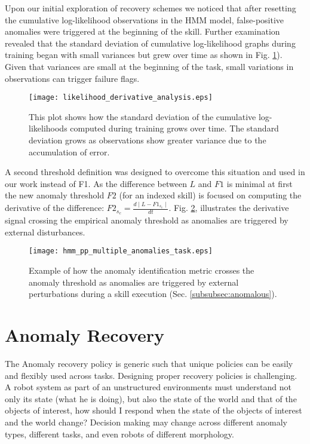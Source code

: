 \documentclass[letterpaper, 10 pt, conference]{ieeeconf}  %
\begin{document}
Upon our initial exploration of recovery schemes we noticed that after resetting the cumulative log-likelihood observations in the HMM model, false-positive anomalies were triggered at the beginning of the skill. Further examination revealed that the standard deviation of cumulative log-likelihood graphs during training began with small variances but grew over time as shown in Fig. \ref{fig:growing_std_dev_likelihood}). Given that variances are small at the beginning of the task, small variations in observations can trigger failure flags. 
\begin{figure}[b]     
	\centering		
		\texttt{[image: likelihood\_derivative\_analysis.eps]}
		\caption{This plot shows how the standard deviation of the cumulative log-likelihoods computed during training grows over time. The standard deviation grows as observations show greater variance due to the accumulation of error.}
        \label{fig:growing_std_dev_likelihood}        
\end{figure}
A second threshold definition was designed to overcome this situation and used in our work instead of F1. As the difference between $L$ and $F1$ is minimal at first the new anomaly threshold $F2$ (for an indexed skill) is focused on computing the derivative of the difference: $F2_{s_c}=\frac{d\mid L-F1_{s_c} \mid}{dt}$. Fig. \ref{fig:derivative_threshold}, illustrates the derivative signal crossing the empirical anomaly threshold as anomalies are triggered by external disturbances.
\begin{figure}     
	\centering		
		\texttt{[image: hmm\_pp\_multiple\_anomalies\_task.eps]}
		\caption{Example of how the anomaly identification metric crosses the anomaly threshold as anomalies are triggered by external perturbations during a skill execution (Sec. \ref{subsubsec:anomalous}).}
        \label{fig:derivative_threshold}        
\end{figure}
\section{Anomaly Recovery} \label{sec:recovery}
The Anomaly recovery policy is generic such that unique policies can be easily and flexibly used across tasks. Designing proper recovery policies is challenging. A robot system as part of an unstructured environments must understand not only its state (what he is doing), but also the state of the world and that of the objects of interest, \ie how should I respond when the state of the objects of interest and the world change? Decision making may change across different anomaly types, different tasks, and even robots of different morphology. 
\end{document}
